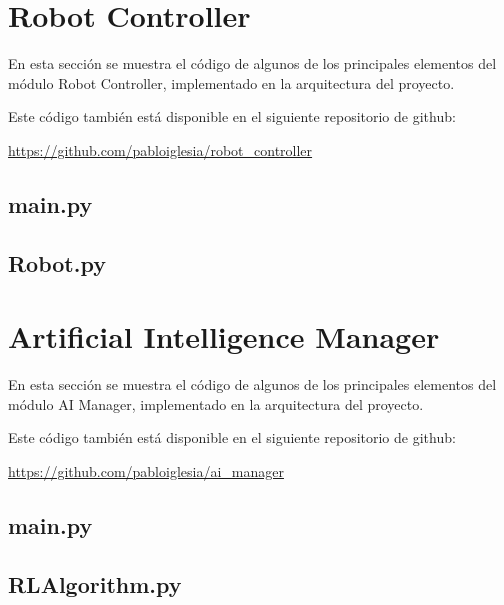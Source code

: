 
	\section{Robot Controller}
		En esta sección se muestra el código de algunos de los principales elementos del módulo Robot Controller, implementado en la arquitectura del proyecto.
		
		Este código también está disponible en el siguiente repositorio de github:  
		
		\href{https://github.com/pabloiglesia/robot_controller}{https://github.com/pabloiglesia/robot\_controller}
		\subsection{main.py}
			
	
		\subsection{Robot.py}
			
			
			
	\section{Artificial Intelligence Manager}
		En esta sección se muestra el código de algunos de los principales elementos del módulo AI Manager, implementado en la arquitectura del proyecto.
		
		Este código también está disponible en el siguiente repositorio de github: 
		
		\href{https://github.com/pabloiglesia/ai_manager}{https://github.com/pabloiglesia/ai\_manager}
			
		\subsection{main.py}
			
			
		\subsection{RLAlgorithm.py}
			
	
